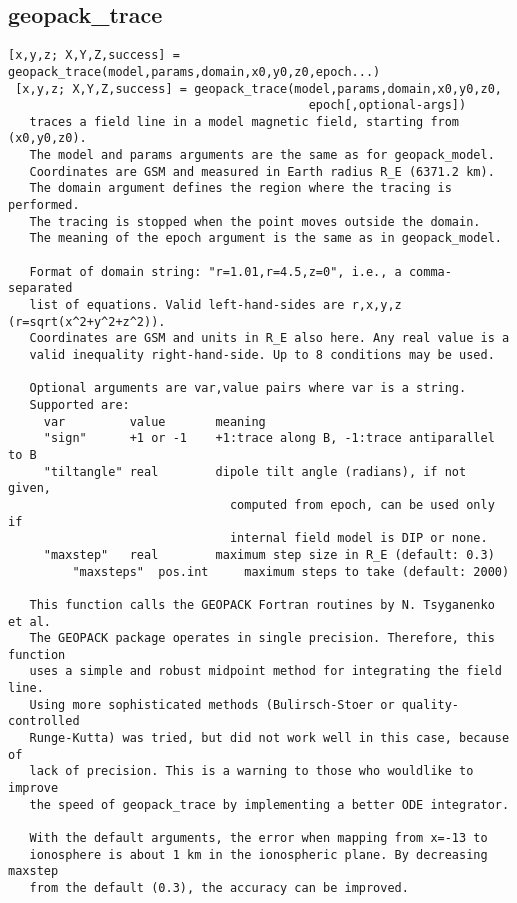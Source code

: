 \documentclass[a4paper]{article}
\begin{document}
\subsection{geopack\_trace\label{geopack_trace}}

\begin{tscreen}
\begin{verbatim}
[x,y,z; X,Y,Z,success] = geopack_trace(model,params,domain,x0,y0,z0,epoch...)
 [x,y,z; X,Y,Z,success] = geopack_trace(model,params,domain,x0,y0,z0,
                                          epoch[,optional-args])
   traces a field line in a model magnetic field, starting from (x0,y0,z0).
   The model and params arguments are the same as for geopack_model.
   Coordinates are GSM and measured in Earth radius R_E (6371.2 km).
   The domain argument defines the region where the tracing is performed.
   The tracing is stopped when the point moves outside the domain.
   The meaning of the epoch argument is the same as in geopack_model.

   Format of domain string: "r=1.01,r=4.5,z=0", i.e., a comma-separated
   list of equations. Valid left-hand-sides are r,x,y,z (r=sqrt(x^2+y^2+z^2)).
   Coordinates are GSM and units in R_E also here. Any real value is a
   valid inequality right-hand-side. Up to 8 conditions may be used.

   Optional arguments are var,value pairs where var is a string.
   Supported are:
     var         value       meaning
     "sign"      +1 or -1    +1:trace along B, -1:trace antiparallel to B
     "tiltangle" real        dipole tilt angle (radians), if not given,
                               computed from epoch, can be used only if
                               internal field model is DIP or none.
     "maxstep"   real        maximum step size in R_E (default: 0.3)
         "maxsteps"  pos.int     maximum steps to take (default: 2000)

   This function calls the GEOPACK Fortran routines by N. Tsyganenko et al.
   The GEOPACK package operates in single precision. Therefore, this function
   uses a simple and robust midpoint method for integrating the field line.
   Using more sophisticated methods (Bulirsch-Stoer or quality-controlled
   Runge-Kutta) was tried, but did not work well in this case, because of
   lack of precision. This is a warning to those who wouldlike to improve
   the speed of geopack_trace by implementing a better ODE integrator.

   With the default arguments, the error when mapping from x=-13 to
   ionosphere is about 1 km in the ionospheric plane. By decreasing maxstep
   from the default (0.3), the accuracy can be improved.


\end{verbatim}
\end{tscreen}
\end{document}
